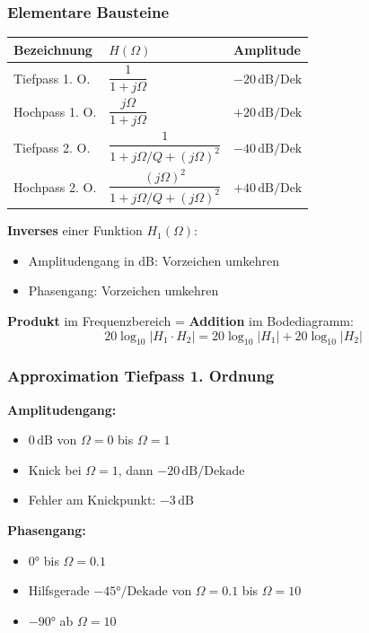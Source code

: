 \documentclass[a4paper,12pt]{article}
\begin{document}
	\subsubsection*{Elementare Bausteine}
	\begin{center}
		\begin{tabular}{lll}
			\hline
			Bezeichnung & $H(\Omega)$ & Amplitude \\
			\hline
			Tiefpass 1. O.  & $\dfrac{1}{1+j\Omega}$                          & $-20\,\text{dB/Dek}$ \\[6pt]
			Hochpass 1. O.  & $\dfrac{j\Omega}{1+j\Omega}$                    & $+20\,\text{dB/Dek}$ \\[6pt]
			Tiefpass 2. O.  & $\dfrac{1}{1+j\Omega/Q+(j\Omega)^2}$            & $-40\,\text{dB/Dek}$ \\[6pt]
			Hochpass 2. O.  & $\dfrac{(j\Omega)^2}{1+j\Omega/Q+(j\Omega)^2}$ & $+40\,\text{dB/Dek}$ \\[6pt]
			\hline
		\end{tabular}
	\end{center}
	
	\textbf{Inverses} einer Funktion $H_1(\Omega)$:
	\begin{itemize}
		\item Amplitudengang in dB: Vorzeichen umkehren
		\item Phasengang: Vorzeichen umkehren
	\end{itemize}
	
	\textbf{Produkt} im Frequenzbereich = \textbf{Addition} im Bodediagramm:
	\begin{equation}
		20\log_{10}|H_1 \cdot H_2| = 20\log_{10}|H_1| + 20\log_{10}|H_2|
	\end{equation}
	
	\subsubsection*{Approximation Tiefpass 1. Ordnung}
	\textbf{Amplitudengang:}
	\begin{itemize}
		\item $0\,\text{dB}$ von $\Omega=0$ bis $\Omega=1$
		\item Knick bei $\Omega=1$, dann $-20\,\text{dB/Dekade}$
		\item Fehler am Knickpunkt: $-3\,\text{dB}$
	\end{itemize}
	\textbf{Phasengang:}
	\begin{itemize}
		\item $0°$ bis $\Omega=0.1$
		\item Hilfsgerade $-45°/\text{Dekade}$ von $\Omega=0.1$ bis $\Omega=10$
		\item $-90°$ ab $\Omega=10$
	\end{itemize}
	
\end{document}
